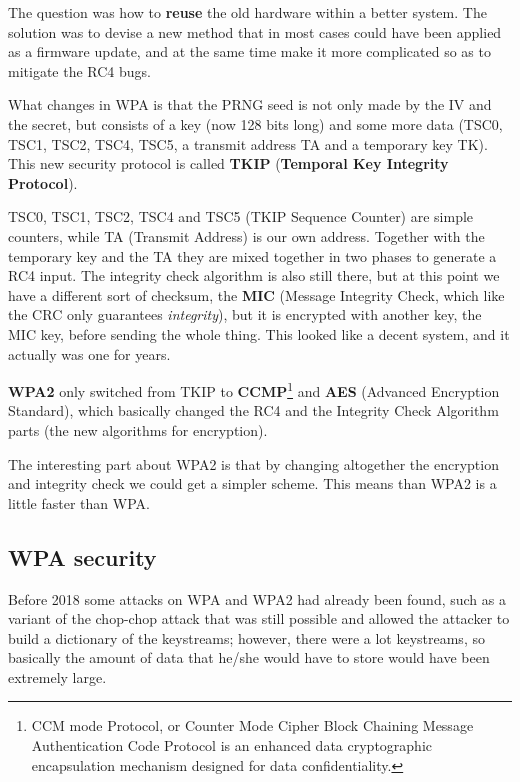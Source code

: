 The question was how to \textbf{reuse} the old hardware within a better system. The solution was to devise a new method that in most cases could have been applied as a firmware update, and at the same time make it more complicated so as to mitigate the RC4 bugs.

What changes in WPA is that the PRNG seed is not only made by the IV and the secret, but consists of a key (now 128 bits long) and some more data (TSC0, TSC1, TSC2, TSC4, TSC5, a transmit address TA and a temporary key TK). This new security protocol is called \textbf{TKIP} (\textbf{Temporal Key Integrity Protocol}).

TSC0, TSC1, TSC2, TSC4 and TSC5 (TKIP Sequence Counter) are simple counters, while TA (Transmit Address) is our own address. Together with the temporary key and the TA they are mixed together in two phases to generate a RC4 input. The integrity check algorithm is also still there, but at this point we have a different sort of checksum, the \textbf{MIC} (Message Integrity Check, which like the CRC only guarantees \textit{integrity}), but it is encrypted with another key, the MIC key, before sending the whole thing. This looked like a decent system, and it actually was one for years.
 
\textbf{WPA2} only switched from TKIP to \textbf{CCMP}\footnote{CCM mode Protocol, or Counter Mode Cipher Block Chaining Message Authentication Code Protocol is an enhanced data cryptographic encapsulation mechanism designed for data confidentiality.} and \textbf{AES} (Advanced Encryption Standard), which basically changed the RC4 and the Integrity Check Algorithm parts (the new algorithms for encryption).

The interesting part about WPA2 is that by changing altogether the encryption and integrity check we could get a simpler scheme. This means than WPA2 is a little faster than WPA.


\subsection{WPA security}
Before 2018 some attacks on WPA and WPA2 had already been found, such as a variant of the chop-chop attack that was still possible and allowed the attacker to build a dictionary of the keystreams; however, there were a lot keystreams, so basically the amount of data that he/she would have to store would have been extremely large.
 
